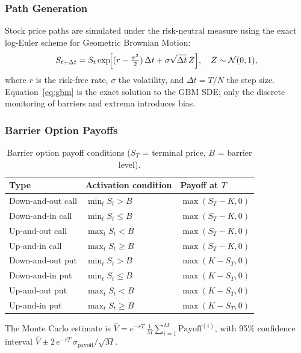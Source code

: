 \documentclass[12pt,a4paper]{article}
\begin{document}
\subsubsection{Path Generation}

Stock price paths are simulated under the risk-neutral measure using the
exact log-Euler scheme for Geometric Brownian Motion:
\begin{equation}
  S_{t+\Delta t} = S_t \exp\!\Bigl[(r - \tfrac{\sigma^2}{2})\,\Delta t
    + \sigma\sqrt{\Delta t}\,Z\Bigr],
    \quad Z\sim\mathcal{N}(0,1),
  \label{eq:gbm}
\end{equation}
where $r$ is the risk-free rate, $\sigma$ the volatility, and $\Delta t = T/N$
the step size.  Equation~\eqref{eq:gbm} is the exact solution to the GBM SDE;
only the discrete monitoring of barriers and extrema introduces bias.

\subsubsection{Barrier Option Payoffs}

\begin{table}[H]
\centering
\caption{Barrier option payoff conditions ($S_T$ = terminal price,
         $B$ = barrier level).}
\label{tab:barrier_payoffs}
\begin{tabular}{L{3.8cm} C{3.0cm} C{4.5cm}}
\toprule
\textbf{Type} & \textbf{Activation condition} & \textbf{Payoff at $T$} \\
\midrule
Down-and-out call & $\min_t S_t > B$ & $\max(S_T - K, 0)$ \\
Down-and-in call  & $\min_t S_t \le B$ & $\max(S_T - K, 0)$ \\
Up-and-out call   & $\max_t S_t < B$ & $\max(S_T - K, 0)$ \\
Up-and-in call    & $\max_t S_t \ge B$ & $\max(S_T - K, 0)$ \\
Down-and-out put  & $\min_t S_t > B$ & $\max(K - S_T, 0)$ \\
Down-and-in put   & $\min_t S_t \le B$ & $\max(K - S_T, 0)$ \\
Up-and-out put    & $\max_t S_t < B$ & $\max(K - S_T, 0)$ \\
Up-and-in put     & $\max_t S_t \ge B$ & $\max(K - S_T, 0)$ \\
\bottomrule
\end{tabular}
\end{table}

The Monte Carlo estimate is $\hat{V} = e^{-rT}\,\frac{1}{M}\sum_{i=1}^{M}
\text{Payoff}^{(i)}$, with 95\% confidence interval
$\hat{V} \pm 2\,e^{-rT}\,\sigma_{\mathrm{payoff}}/\!\sqrt{M}$.
\end{document}
